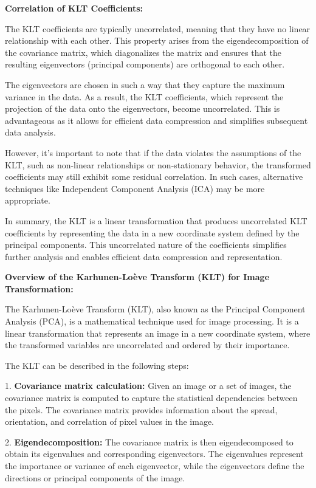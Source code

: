 \documentclass{article}
\begin{document}
\textbf{Correlation of KLT Coefficients:}

The KLT coefficients are typically uncorrelated, meaning that they have no linear relationship with each other. This property arises from the eigendecomposition of the covariance matrix, which diagonalizes the matrix and ensures that the resulting eigenvectors (principal components) are orthogonal to each other.

The eigenvectors are chosen in such a way that they capture the maximum variance in the data. As a result, the KLT coefficients, which represent the projection of the data onto the eigenvectors, become uncorrelated. This is advantageous as it allows for efficient data compression and simplifies subsequent data analysis.

However, it's important to note that if the data violates the assumptions of the KLT, such as non-linear relationships or non-stationary behavior, the transformed coefficients may still exhibit some residual correlation. In such cases, alternative techniques like Independent Component Analysis (ICA) may be more appropriate.

In summary, the KLT is a linear transformation that produces uncorrelated KLT coefficients by representing the data in a new coordinate system defined by the principal components. This uncorrelated nature of the coefficients simplifies further analysis and enables efficient data compression and representation.

\textbf{Overview of the Karhunen-Loève Transform (KLT) for Image Transformation:}

The Karhunen-Loève Transform (KLT), also known as the Principal Component Analysis (PCA), is a mathematical technique used for image processing. It is a linear transformation that represents an image in a new coordinate system, where the transformed variables are uncorrelated and ordered by their importance.

The KLT can be described in the following steps:

1. \textbf{Covariance matrix calculation:} Given an image or a set of images, the covariance matrix is computed to capture the statistical dependencies between the pixels. The covariance matrix provides information about the spread, orientation, and correlation of pixel values in the image.

2. \textbf{Eigendecomposition:} The covariance matrix is then eigendecomposed to obtain its eigenvalues and corresponding eigenvectors. The eigenvalues represent the importance or variance of each eigenvector, while the eigenvectors define the directions or principal components of the image.
\end{document}
